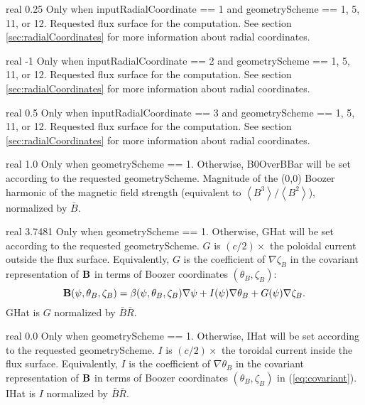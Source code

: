 \myhrule

{real}
{0.25}
{Only when {\ttfamily inputRadialCoordinate} == 1 and {\ttfamily geometryScheme} == 1, 5, 11, or 12.}
{Requested flux surface for the computation.  See section \ref{sec:radialCoordinates}
for more information about radial coordinates.}

\myhrule

{real}
{-1}
{Only when {\ttfamily inputRadialCoordinate} == 2 and {\ttfamily geometryScheme} == 1, 5, 11, or 12.}
{Requested flux surface for the computation.  See section \ref{sec:radialCoordinates}
for more information about radial coordinates.}

\myhrule

{real}
{0.5}
{Only when {\ttfamily inputRadialCoordinate} == 3 and {\ttfamily geometryScheme} == 1, 5, 11, or 12.}
{Requested flux surface for the computation.  See section \ref{sec:radialCoordinates}
for more information about radial coordinates.}

\myhrule

{real}
{1.0}
{Only when {\ttfamily geometryScheme} == 1. Otherwise, {\ttfamily B0OverBBar} will be set according to the requested {\ttfamily geometryScheme}.}
{Magnitude of the (0,0) Boozer harmonic of the magnetic field strength (equivalent to $\left< B^3\right>/\left<B^2\right>$), normalized by $\bar{B}$.}

\myhrule

{real}
{3.7481}
{Only when {\ttfamily geometryScheme} == 1. Otherwise, {\ttfamily GHat} will be set according to the requested {\ttfamily geometryScheme}.}
{$G$ is $(c/2)\times$ the poloidal current outside the flux
 surface. Equivalently, $G$ is the coefficient of $\nabla\zeta_B$ in the
 covariant representation of ${\mathbf B}$ in terms of Boozer coordinates $(\theta_B,\zeta_B)$:
\begin{equation}
\label{eq:covariant}
{\mathbf B}(\psi,\theta_B,\zeta_B) = \beta(\psi,\theta_B,\zeta_B)\nabla\psi + I(\psi)\nabla\theta_B + G(\psi)\nabla\zeta_B.
\end{equation}
{\ttfamily GHat} is $G$ normalized by $\bar{B}\bar{R}$.}

\myhrule

{real}
{0.0}
{Only when {\ttfamily geometryScheme} == 1. Otherwise, {\ttfamily IHat} will be set according to the requested {\ttfamily geometryScheme}.}
{$I$ is $(c/2)\times$ the toroidal current inside the flux
 surface. Equivalently, $I$ is the coefficient of $\nabla\theta_B$ in the
 covariant representation of ${\mathbf B}$ in terms of Boozer coordinates $(\theta_B,\zeta_B)$ in (\ref{eq:covariant}).
{\ttfamily IHat} is $I$ normalized by $\bar{B}\bar{R}$.}

